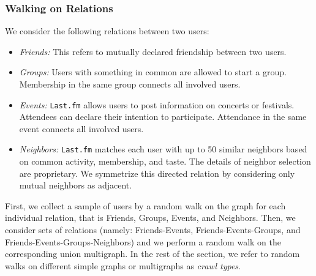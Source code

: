 \documentclass[10pt, conference]{./IEEEtran}
\newcommand{\lastfm}{{\tt Last.fm}\xspace}
\begin{document}
%

\subsubsection{Walking on Relations}

We consider the following relations between two users:
\begin{itemize}
\item { \textit{Friends:}} This refers to mutually declared friendship between two users.
\item { \textit{Groups:}} Users with something in common are allowed to start a group. Membership in the same group connects all involved users.
\item { \textit{Events:}} \lastfm allows users to post information on concerts or festivals. Attendees can declare their intention to participate. Attendance in the same event connects all involved users.
\item { \textit{Neighbors:}} \lastfm matches each user with up to 50 similar neighbors based on common activity, membership, and taste. The details of neighbor selection are proprietary.  We symmetrize this directed relation by considering only mutual neighbors as adjacent.
\end{itemize}


First, we collect a sample of users by a random walk on the graph for each individual relation, that is Friends, Groups, Events, and Neighbors.  Then, we consider sets of relations (namely: Friends-Events, Friends-Events-Groups, and Friends-Events-Groups-Neighbors) and we perform a random walk on the corresponding union multigraph. In the rest of the section, we refer to random walks on different simple graphs or multigraphs as {\em  crawl types}.
\end{document}
